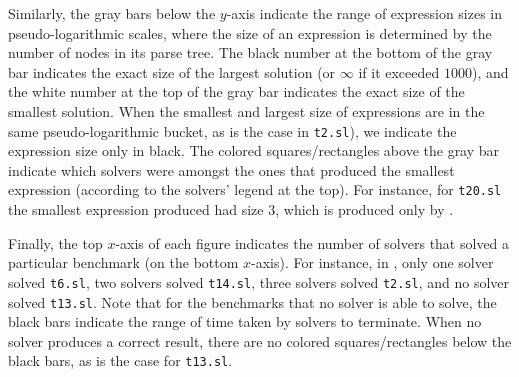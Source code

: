 Similarly, the gray bars below the $y$-axis indicate the range of expression sizes in pseudo-logarithmic scales,
where the size of an expression is determined by the number of nodes in its parse tree.
The black number at the bottom of the gray bar indicates the exact size of the largest solution (or $\infty$ if it exceeded $1000$),
and the white number at the top of the gray bar indicates the exact size of the smallest solution.
When the smallest and largest size of expressions are in the same pseudo-logarithmic bucket, as is the case in \texttt{t2.sl}),
we indicate the expression size only in black.
The colored squares/rectangles above the gray bar indicate which solvers were amongst the ones that produced the smallest expression
(according to the solvers' legend at the top).
For instance, for \texttt{t20.sl} the smallest expression produced had size $3$,
which is produced only by \eusolvernew.

Finally, the top $x$-axis of each figure indicates the number of solvers that solved a particular benchmark (on the bottom $x$-axis).
For instance, in , only one solver solved \texttt{t6.sl}, two solvers solved \texttt{t14.sl},
three solvers solved \texttt{t2.sl}, and no solver solved \texttt{t13.sl}.
Note that for the benchmarks that no solver is able to solve, the black bars indicate the range of time taken by solvers to terminate.
When no solver produces a correct result, there are no colored squares/rectangles below the black bars, as is the case for \texttt{t13.sl}.



